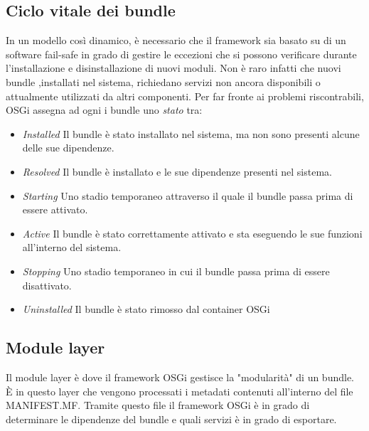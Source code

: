 \subsection{Ciclo vitale dei bundle}\hypertarget{cycle_bundle}{}
In un modello così dinamico, è necessario che il framework sia basato su di un
software fail-safe in grado di gestire le eccezioni che si possono verificare
durante l'installazione e disinstallazione di nuovi moduli.
Non è raro infatti che nuovi bundle ,installati nel sistema, richiedano servizi
non ancora disponibili o attualmente utilizzati da altri componenti.
Per far fronte ai problemi riscontrabili, OSGi assegna ad ogni  i bundle  uno 
\emph{stato} tra:
\begin{itemize}
        \item   \textit{Installed} Il bundle è stato installato nel sistema, ma
                non sono presenti alcune delle sue dipendenze.
        \item   \textit{Resolved} Il bundle è installato e le sue dipendenze
                presenti nel sistema.
        \item   \textit{Starting} Uno stadio temporaneo attraverso il quale il
                bundle passa prima di essere attivato.
        \item   \textit{Active} Il bundle è stato correttamente attivato e sta
                eseguendo le sue funzioni all'interno del sistema.
        \item   \textit{Stopping} Uno stadio temporaneo in cui il bundle passa
                prima di essere disattivato.
        \item   \textit{Uninstalled} Il bundle è stato rimosso dal container
                OSGi
\end{itemize}

\subsection{Module layer}
Il module layer è dove il framework OSGi gestisce la "modularità" di un bundle.
È in questo layer che vengono processati i metadati contenuti all'interno del
file MANIFEST.MF. Tramite questo file il framework OSGi è in grado di
determinare le dipendenze del bundle e quali servizi è in grado di esportare.

